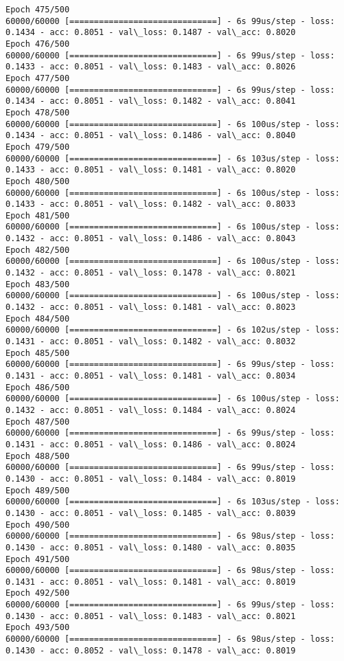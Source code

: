 \documentclass[11pt]{article}
\begin{document}
\begin{Verbatim}[commandchars=\\\{\}]
Epoch 475/500
60000/60000 [==============================] - 6s 99us/step - loss: 0.1434 - acc: 0.8051 - val\_loss: 0.1487 - val\_acc: 0.8020
Epoch 476/500
60000/60000 [==============================] - 6s 99us/step - loss: 0.1433 - acc: 0.8051 - val\_loss: 0.1483 - val\_acc: 0.8026
Epoch 477/500
60000/60000 [==============================] - 6s 99us/step - loss: 0.1434 - acc: 0.8051 - val\_loss: 0.1482 - val\_acc: 0.8041
Epoch 478/500
60000/60000 [==============================] - 6s 100us/step - loss: 0.1434 - acc: 0.8051 - val\_loss: 0.1486 - val\_acc: 0.8040
Epoch 479/500
60000/60000 [==============================] - 6s 103us/step - loss: 0.1433 - acc: 0.8051 - val\_loss: 0.1481 - val\_acc: 0.8020
Epoch 480/500
60000/60000 [==============================] - 6s 100us/step - loss: 0.1433 - acc: 0.8051 - val\_loss: 0.1482 - val\_acc: 0.8033
Epoch 481/500
60000/60000 [==============================] - 6s 100us/step - loss: 0.1432 - acc: 0.8051 - val\_loss: 0.1486 - val\_acc: 0.8043
Epoch 482/500
60000/60000 [==============================] - 6s 100us/step - loss: 0.1432 - acc: 0.8051 - val\_loss: 0.1478 - val\_acc: 0.8021
Epoch 483/500
60000/60000 [==============================] - 6s 100us/step - loss: 0.1432 - acc: 0.8051 - val\_loss: 0.1481 - val\_acc: 0.8023
Epoch 484/500
60000/60000 [==============================] - 6s 102us/step - loss: 0.1431 - acc: 0.8051 - val\_loss: 0.1482 - val\_acc: 0.8032
Epoch 485/500
60000/60000 [==============================] - 6s 99us/step - loss: 0.1431 - acc: 0.8051 - val\_loss: 0.1481 - val\_acc: 0.8034
Epoch 486/500
60000/60000 [==============================] - 6s 100us/step - loss: 0.1432 - acc: 0.8051 - val\_loss: 0.1484 - val\_acc: 0.8024
Epoch 487/500
60000/60000 [==============================] - 6s 99us/step - loss: 0.1431 - acc: 0.8051 - val\_loss: 0.1486 - val\_acc: 0.8024
Epoch 488/500
60000/60000 [==============================] - 6s 99us/step - loss: 0.1430 - acc: 0.8051 - val\_loss: 0.1484 - val\_acc: 0.8019
Epoch 489/500
60000/60000 [==============================] - 6s 103us/step - loss: 0.1430 - acc: 0.8051 - val\_loss: 0.1485 - val\_acc: 0.8039
Epoch 490/500
60000/60000 [==============================] - 6s 98us/step - loss: 0.1430 - acc: 0.8051 - val\_loss: 0.1480 - val\_acc: 0.8035
Epoch 491/500
60000/60000 [==============================] - 6s 98us/step - loss: 0.1431 - acc: 0.8051 - val\_loss: 0.1481 - val\_acc: 0.8019
Epoch 492/500
60000/60000 [==============================] - 6s 99us/step - loss: 0.1430 - acc: 0.8051 - val\_loss: 0.1483 - val\_acc: 0.8021
Epoch 493/500
60000/60000 [==============================] - 6s 98us/step - loss: 0.1430 - acc: 0.8052 - val\_loss: 0.1478 - val\_acc: 0.8019

\end{Verbatim}
\end{document}
